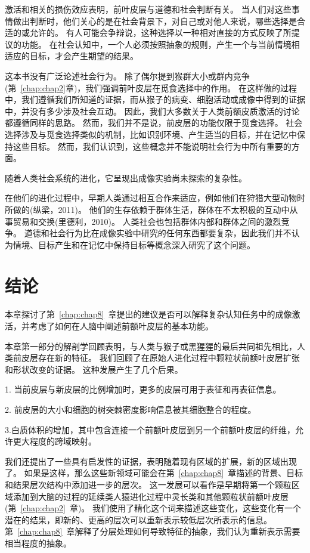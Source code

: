 激活和相关的损伤效应表明，前叶皮层与道德和社会判断有关。
当人们对这些事情做出判断时，他们关心的是在社会背景下，对自己或对他人来说，哪些选择是合适的或允许的。
有人可能会争辩说，这种选择以一种相对直接的方式反映了所提议的功能。
在社会认知中，一个人必须按照抽象的规则，产生一个与当前情境相适应的目标，才会产生期望的结果。


这本书没有广泛论述社会行为。
除了偶尔提到猴群大小或群内竞争(第~\ref{chap:chap2}章)，我们强调前叶皮层在觅食选择中的作用。
在这样做的过程中，我们遵循我们所知道的证据，而从猴子的病变、细胞活动或成像中得到的证据中，并没有多少涉及社会互动。
因此，我们大多数关于人类前额皮质激活的讨论都遵循同样的思路。
然而，我们并不是说，前皮层的功能仅限于觅食选择。
社会选择涉及与觅食选择类似的机制，比如识别环境、产生适当的目标，并在记忆中保持这些目标。
然而，我们认识到，这些概念并不能说明社会行为中所有重要的方面。


随着人类社会系统的进化，它呈现出成像实验尚未探索的复杂性。


在他们的进化过程中，早期人类通过相互合作来适应，例如他们在狩猎大型动物时所做的(纵梁，2011)。
他们的生存依赖于群体生活，群体在不太积极的互动中从事贸易和交换(里德利，2010)。
人类社会也包括群体内部和群体之间的激烈竞争。
道德和社会行为比在成像实验中研究的任何东西都要复杂，因此我们并不认为情境、目标产生和在记忆中保持目标等概念深入研究了这个问题。



\section{结论}

本章探讨了第~\ref{chap:chap8}~章提出的建议是否可以解释复杂认知任务中的成像激活，并考虑了如何在人脑中阐述前额叶皮层的基本功能。


本章第一部分的解剖学回顾表明，与人类与猴子或黑猩猩的最后共同祖先相比，人类前皮层存在新的特征。
我们回顾了在原始人进化过程中颗粒状前额叶皮层扩张和形状改变的证据。
这种发展产生了几个后果。


1. 当前皮层与新皮层的比例增加时，更多的皮层可用于表征和再表征信息。


2. 前皮层的大小和细胞的树突棘密度影响信息被其细胞整合的程度。


3.白质体积的增加，其中包含连接一个前额叶皮层到另一个前额叶皮层的纤维，允许更大程度的跨域映射。


我们还提出了一些具有启发性的证据，表明随着现有区域的扩展，新的区域出现了。
如果是这样，那么这些新领域可能会在第~\ref{chap:chap8}~章描述的背景、目标和结果层次结构中添加进一步的层次。
这一发展可以看作是早期将第一个颗粒区域添加到大脑的过程的延续类人猿进化过程中灵长类和其他颗粒状前额叶皮层(第~\ref{chap:chap2}~章)。
我们使用了精化这个词来描述这些变化，这些变化有一个潜在的结果，即新的、更高的层次可以重新表示较低层次所表示的信息。
第~\ref{chap:chap8}~章解释了分层处理如何导致特征的抽象，我们认为重新表示需要相当程度的抽象。


